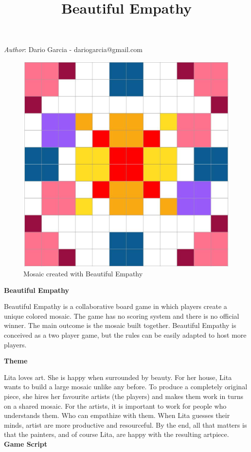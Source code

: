 \documentclass[twocolumn]{article}
\title{Beautiful Empathy}
\newcommand{\lvl}[1]{\vspace{0.5cm}\Large{\textbf{#1}}\vspace{0.2cm}}
\begin{document}
\maketitle

\textit{Author}: Dario Garcia - dariogarcia@gmail.com

\begin{figure}[h!]
\centering
\includegraphics[scale=0.25]{First_ever.jpg}
\caption{Mosaic created with Beautiful Empathy}
\label{fig:mosaic}
\end{figure}

\lvl{Beautiful Empathy}

Beautiful Empathy is a collaborative board game in which players create a unique colored mosaic. The game has no scoring system and there is no official winner. The main outcome is the mosaic built together. Beautiful Empathy is conceived as a two player game, but the rules can be easily adapted to host more players. 

\vspace{1cm}
\lvl{Theme}

Lita loves art. She is happy when surrounded by beauty. For her house, Lita wants to build a large mosaic unlike any before. To produce a completely original piece, she hires her favourite artists (the players) and makes them work in turns on a shared mosaic. For the artists, it is important to work for people who understands them. Who can empathize with them. When Lita guesses their minds, artist are more productive and resourceful. By the end, all that matters is that the painters, and of course Lita, are happy with the resulting artpiece.
\newpage
\lvl{Game Script}
\end{document}
